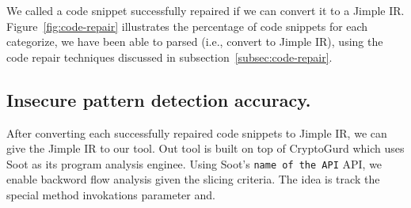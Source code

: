 We called a code snippet successfully repaired if we can convert it to a Jimple IR. Figure~\ref{fig:code-repair} illustrates the percentage of code snippets for each categorize, we have been able to parsed (i.e., convert to Jimple IR), using the code repair techniques discussed in subsection~\ref{subsec:code-repair}.  
\subsection{Insecure pattern detection accuracy.}
After converting each successfully repaired code snippets to Jimple IR, we can give the Jimple IR to our tool. Out tool is built on top of CryptoGurd which uses Soot as its program analysis enginee. Using Soot's \texttt{name of the API} API, we enable backword flow analysis given the slicing criteria. The idea is track the special method invokations parameter and.
